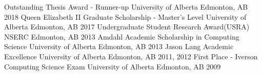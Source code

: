 \begin{cvhonors}
    \cvhonor
    {Outstanding Thesis Award - Runner-up}
    {University of Alberta}
    {Edmonton, AB}
    {2018}
    \cvhonor
    {Queen Elizabeth II Graduate Scholarship - Master's Level}
    {University of Alberta}
    {Edmonton, AB}
    {2017}
    \cvhonor
    {Undergraduate Student Research Award(USRA)}
    {NSERC}
    {Edmonton, AB}
    {2013}
    \cvhonor
    {Amdahl Academic Scholarship in Computing Science}
    {University of Alberta}
    {Edmonton, AB}
    {2013}
    \cvhonor
    {Jason Lang Academic Excellence}
    {University of Alberta}
    {Edmonton, AB}
    {2011, 2012}
    \cvhonor
    {First Place - Iverson Computing Science Exam}
    {University of Alberta}
    {Edmonton, AB}
    {2009}
\end{cvhonors}

